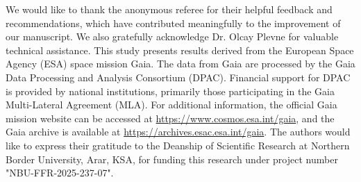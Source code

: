 \documentclass[referee]{raa}            %
\begin{document}
\begin{acknowledgements}
We would like to thank the anonymous referee for their helpful feedback and recommendations, which have contributed meaningfully to the improvement of our manuscript. We also gratefully acknowledge Dr. Olcay Plevne for valuable technical assistance. This study presents results derived from the European Space Agency (ESA) space mission Gaia. The data from Gaia are processed by the Gaia Data Processing and Analysis Consortium (DPAC). Financial support for DPAC is provided by national institutions, primarily those participating in the Gaia Multi-Lateral Agreement (MLA). For additional information, the official Gaia mission website can be accessed at \url{https://www.cosmos.esa.int/gaia}, and the Gaia archive is available at \url{https://archives.esac.esa.int/gaia}. The authors would like to express their gratitude to the Deanship of Scientific Research at Northern Border University, Arar, KSA, for funding this research under project number "NBU-FFR-2025-237-07". 
\end{acknowledgements}



\end{document}
